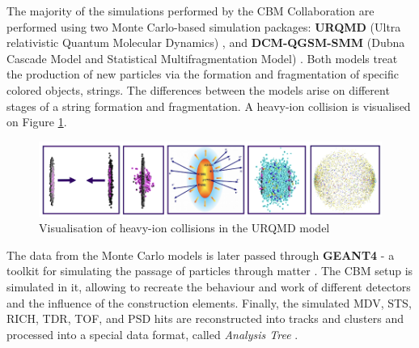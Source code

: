 The majority of the simulations performed by the CBM Collaboration are performed using two Monte Carlo-based simulation packages: \textbf{URQMD} (Ultra relativistic Quantum Molecular Dynamics) \cite{urqmd}, and \textbf{DCM-QGSM-SMM} (Dubna Cascade Model and Statistical Multifragmentation Model) \cite{dcm}. Both models  treat the production of new particles via the formation and fragmentation of specific colored objects, strings. The differences between the models arise on different stages of a string formation and fragmentation. \cite{dcm}
 A heavy-ion collision is visualised on Figure \ref{urqmd}.

\begin{figure}[H]
    \centering
    \includegraphics[width=.9\textwidth]{img/urqmd.png}
    \caption{Visualisation of heavy-ion collisions in the URQMD model\cite{slodkowski}}
    \label{urqmd}
\end{figure}

The data from the Monte Carlo models is later passed through \textbf{GEANT4} - a toolkit for simulating the passage of particles through matter \cite{geant4}. The CBM setup is simulated in it, allowing to recreate the behaviour and work of different detectors and the influence of the construction elements. Finally, the simulated MDV, STS, RICH, TDR, TOF, and PSD hits are reconstructed into tracks and clusters and processed into a special data format, called \emph{Analysis Tree} \cite{atree}.


